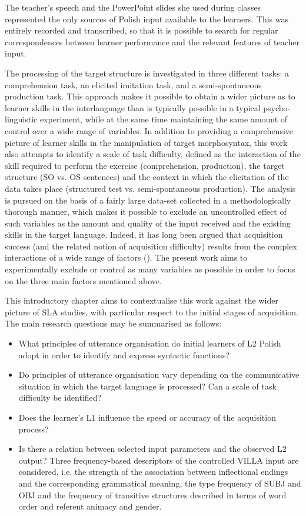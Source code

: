 The teacher’s speech and the PowerPoint slides she used during classes represented the only sources of Polish input available to the learners. This was entirely recorded and transcribed, so that it is possible to search for regular correspondences between learner performance and the relevant features of teacher input.

The processing of the target structure is investigated in three different tasks: a comprehension task, an elicited imitation task, and a semi-spontaneous production task. This approach makes it possible to obtain a wider picture as to learner skills in the interlanguage than is typically possible in a typical psycho-linguistic experiment, while at the same time maintaining the same amount of control over a wide range of variables. In addition to providing a comprehensive picture of learner skills in the manipulation of target morphosyntax, this work also attempts to identify a scale of task difficulty, defined as the interaction of the skill required to perform the exercise (comprehension, production), the target structure (SO vs. OS sentences) and the context in which the elicitation of the data takes place (structured test vs. semi-spontaneous production). The analysis is pursued on the basis of a fairly large data-set collected in a methodologically thorough manner, which makes it possible to exclude an uncontrolled effect of such variables as the amount and quality of the input received and the existing skills in the target language. Indeed, it has long been argued that acquisition success (and the related notion of acquisition difficulty) results from the complex interactions of a wide range of factors (\citealt{HousenSimoens2016}). The present work aims to experimentally exclude or control as many variables as possible in order to focus on the three main factors mentioned above.

This introductory chapter aims to contextualise this work against the wider picture of SLA studies, with particular respect to the initial stages of acquisition. The main research questions may be summarised as follows:

\begin{itemize}
    \item What principles of utterance organisation do initial learners of L2 Polish adopt in order to identify and express syntactic functions?
    \item Do principles of utterance organisation vary depending on the communicative situation in which the target language is processed? Can a scale of task difficulty be identified?
    \item Does the learner’s L1 influence the speed or accuracy of the acquisition process?
    \item Is there a relation between selected input parameters and the observed L2 output? Three frequency-based descriptors of the controlled VILLA input are considered, i.e. the strength of the association between inflectional endings and the corresponding grammatical meaning, the type frequency of SUBJ and OBJ and the frequency of transitive structures described in terms of word order and referent animacy and gender.
\end{itemize}

